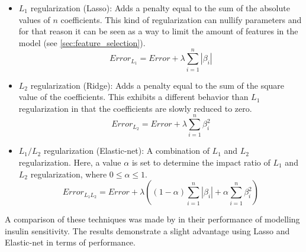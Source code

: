 \begin{itemize}
	\item{$L_1$ regularization (Lasso):} Adds a penalty equal to the sum of the absolute values of $n$ coefficients. This kind of regularization can nullify parameters and for that reason it can be seen as a way to limit the amount of features in the model (see \ref{sec:feature_selection}).
		\begin{equation}
			Error_{L_1} = Error + \lambda \sum_{i=1}^{n}|\beta_i| 
		\end{equation}
	\item{$L_2$ regularization (Ridge):} Adds a penalty equal to the sum of the square value of the coefficients. This exhibits a different behavior than $L_1$ regularization in that the coefficients are slowly reduced to zero.
		\begin{equation}
			Error_{L_2} = Error + \lambda \sum_{i=1}^{n}\beta_i^2 
		\end{equation}
	\item{$L_1/L_2$ regularization (Elastic-net):} A combination of $L_1$ and $L_2$ regularization. Here, a value $\alpha$ is set to determine the impact ratio of $L_1$ and $L_2$ regularization, where $0 \leq \alpha \leq 1$.
 		\begin{equation}
			Error_{L_1L_2} = Error + \lambda ( (1-\alpha)\sum_{i=1}^{n}|\beta_i| + \alpha  \sum_{i=1}^{n}\beta_i^2 ) 
		\end{equation}
\end{itemize}

	A comparison of these techniques was made by \cite{ARTICLE:21} in their performance of modelling insulin sensitivity. The results demonstrate a slight advantage using Lasso and Elastic-net in terms of performance. 


